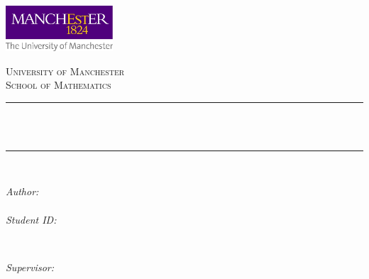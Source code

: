 \begin{titlepage}

\newcommand{\HRule}{\rule{\linewidth}{0.5mm}} %



\includegraphics[width = 4cm]{TeX_files/figures/imperial.jpg}\\[0.5cm] 

\center %


\textsc{\Large University of Manchester}\\[0.5cm] 
\textsc{\large School of Mathematics}\\[0.5cm] 


\HRule \\[0.4cm]
{ \huge \bfseries \reporttitle}\\ %
\HRule \\[1.5cm]
 

\begin{minipage}[t]{0.4\textwidth}
\begin{flushleft} \large
\emph{Author:}\\
\reportauthor \\%
\bigskip
\emph{Student ID:}\\
\studentID
\end{flushleft}
\end{minipage}
~
\begin{minipage}[t]{0.4\textwidth}
\begin{flushright} \large
\emph{Supervisor:} \\
\supervisor %
\end{flushright}
\end{minipage}\\[4cm]



\end{titlepage}
